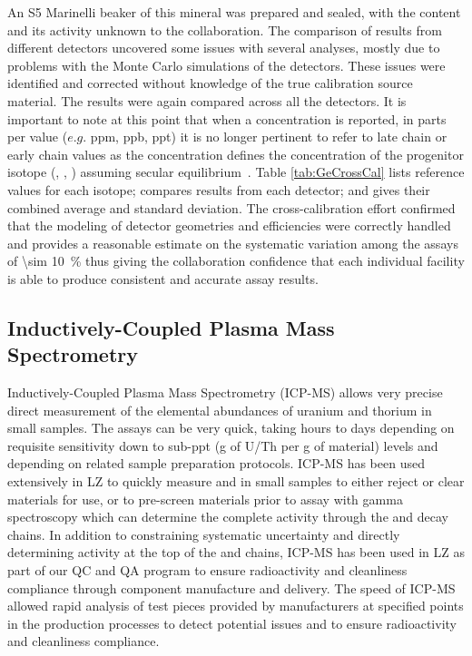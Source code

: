 An S5 Marinelli beaker of this mineral was prepared and sealed, with the content and its activity unknown to the collaboration. The comparison of results from different detectors uncovered some issues with several analyses, mostly due to problems with the Monte Carlo simulations of the detectors. These issues were identified and corrected without knowledge of the true calibration source material. The results were again compared across all the detectors. It is important to note at this point that when a concentration is reported, in parts per value ($e.g.$ ppm, ppb, ppt) it is no longer pertinent to refer to late chain or early chain values as the concentration defines the concentration of the progenitor isotope (\UTTE{ }, \UTTF{}{}, \ThTTT{}) assuming secular equilibrium~\cite{malling:2013jya}. Table \ref{tab:GeCrossCal} lists reference values for each isotope; compares results from each detector; and gives their combined average and standard deviation. The cross-calibration effort confirmed that the modeling of detector geometries and efficiencies were correctly handled and provides a reasonable estimate on the systematic variation among the assays of \SI{\sim 10}{\percent} thus giving the collaboration confidence that each individual facility is able to produce consistent and accurate assay results.


\subsection{Inductively-Coupled Plasma Mass Spectrometry}
\label{subsec:ICPMS}

Inductively-Coupled Plasma Mass Spectrometry (ICP-MS) allows very precise direct measurement of the elemental abundances of uranium and thorium in small samples. The assays can be very quick, taking hours to days depending on requisite sensitivity down to sub-ppt (\si{\gram} of U/Th per \si{\gram} of material) levels and depending on related sample preparation protocols. ICP-MS has been used extensively in LZ to quickly measure \utTe{} and \thtTt{} in small samples to either reject or clear materials for use, or to pre-screen materials prior to  assay with gamma spectroscopy which can determine the complete activity through the \utTe{} and \thtTt{} decay chains. In addition to constraining systematic uncertainty and directly determining activity at the top of the \utTe{} and \thtTt{} chains, ICP-MS has been used in LZ as part of our QC and QA program to ensure radioactivity and cleanliness compliance through component manufacture and delivery. The speed of ICP-MS allowed rapid analysis of test pieces provided by manufacturers at specified points in the production processes to detect potential issues and to ensure radioactivity and cleanliness compliance. 

